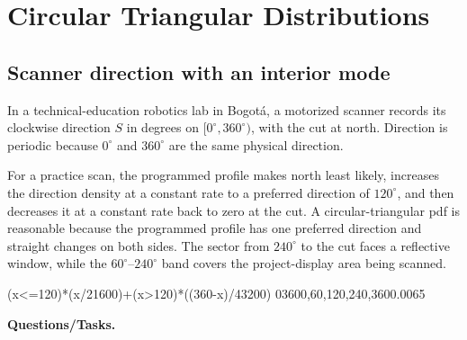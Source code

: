 	
	\newpage
	\section{Circular Triangular Distributions}\label{sec:c3-triangular}
	
	\subsection{Scanner direction with an interior mode}\label{sec:c3-triangular-scanner}
	In a technical-education robotics lab in Bogot\'a, a motorized scanner records
	its clockwise direction $S$ in degrees on $[0^\circ,360^\circ)$, with the cut at
	north.  Direction is periodic because $0^\circ$ and $360^\circ$ are the same
	physical direction.
	
	For a practice scan, the programmed profile makes north least likely, increases
	the direction density at a constant rate to a preferred direction of
	$120^\circ$, and then decreases it at a constant rate back to zero at the cut.
	A circular-triangular pdf is reasonable because the programmed profile has one
	preferred direction and straight changes on both sides.  The sector from
	$240^\circ$ to the cut faces a reflective window, while the
	$60^\circ$--$240^\circ$ band covers the project-display area being scanned.
	
	\begingroup
	{(x<=120)*(x/21600)+(x>120)*((360-x)/43200)}
	{0}{360}{0,60,120,240,360}{0.0065}
	\endgroup
	
	\textbf{Questions/Tasks.}
	\begin{enumerate}
	\end{enumerate}
	
